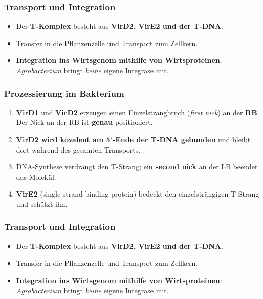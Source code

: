 \subsubsection*{Transport und Integration}
\begin{itemize}
    \item Der \textbf{T-Komplex} besteht aus \textbf{VirD2, VirE2 und der T-DNA}.
    \item Transfer in die Pflanzenzelle und Transport zum Zellkern.
    \item \textbf{Integration ins Wirtsgenom mithilfe von Wirtsproteinen}:
    \emph{Agrobacterium} bringt \emph{keine} eigene Integrase mit.
\end{itemize}



\subsubsection*{Prozessierung im Bakterium}
\begin{enumerate}
    \item \textbf{VirD1} und \textbf{VirD2} erzeugen einen Einzelstrangbruch
    (\emph{first nick}) an der \textbf{RB}.
    Der Nick an der RB ist
    \textbf{genau} positioniert.
    \item \textbf{VirD2 wird kovalent am 5$'$-Ende der T-DNA gebunden} und bleibt
    dort während des gesamten Transports.
    \item DNA-Synthese verdrängt den T-Strang; ein \textbf{second nick} an der LB
    beendet das Molekül.
    \item \textbf{VirE2} (single strand binding protein) bedeckt den
    einzelsträngigen T-Strang und schützt ihn.
\end{enumerate}

\subsubsection*{Transport und Integration}
\begin{itemize}
    \item Der \textbf{T-Komplex} besteht aus \textbf{VirD2, VirE2 und der T-DNA}.
    \item Transfer in die Pflanzenzelle und Transport zum Zellkern.
    \item \textbf{Integration ins Wirtsgenom mithilfe von Wirtsproteinen}:
    \emph{Agrobacterium} bringt \emph{keine} eigene Integrase mit.
\end{itemize}

